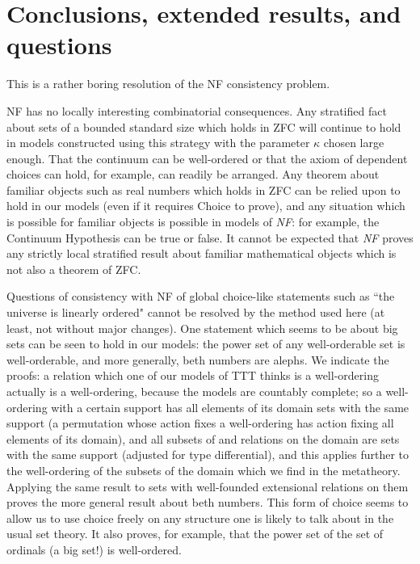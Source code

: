 \documentclass[112pt]{article}
\begin{document}
\newpage

\section{Conclusions, extended results, and questions}
\begin{comment}
[I have copied in the conclusions section of an older version, but what it says should be about right, 
and may require some revisions to fit in this paper.  I also added the bibliography, which again is probably approximately the right one.]
\end{comment}

This is a rather boring resolution of the NF consistency problem.

NF has no locally interesting combinatorial consequences.   Any stratified fact about sets of a bounded standard size which holds in ZFC will continue to hold in models constructed using this strategy with the parameter $\kappa$ chosen large enough.
That the continuum can be well-ordered or that the axiom of dependent choices can hold, for example, can readily be arranged.  Any theorem about familiar objects such as real numbers which holds in ZFC can be relied upon to hold in our models
(even if it requires Choice to prove), and any situation which is possible for familiar objects is possible in models of {\em NF\/}:  for example, the Continuum Hypothesis can be true or false.  It cannot be expected that {\em NF\/} proves any strictly local stratified result about familiar mathematical objects which is not also a theorem of ZFC.

Questions of consistency with NF of global choice-like statements such as ``the universe is linearly ordered"  cannot be resolved by the method used here (at least, not without major changes).  One statement which seems to be about big sets can be seen to hold in our models:  the power set of any well-orderable set is well-orderable, and more generally, beth numbers are alephs.  We indicate the proofs:  a relation which one of our models of TTT thinks is a well-ordering actually is a well-ordering, because the models are countably complete;  so a well-ordering with a certain support has all elements of its domain sets with the same support (a permutation whose action fixes a well-ordering has action fixing all elements of its domain), and all subsets of and relations on the domain are sets with the same support (adjusted for type differential), and this applies further to the well-ordering of the subsets of the domain which we find in the metatheory.  Applying the same result to sets with well-founded extensional relations on them proves the more general result about beth numbers.  This form of choice seems to allow us to use choice freely on any structure one is likely to talk about in the usual set theory.  It also proves, for example, that the power set of the set of ordinals (a big set!) is well-ordered.
\end{document}
